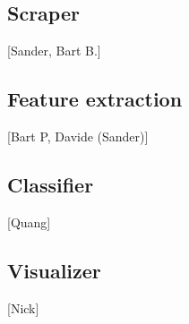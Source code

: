 \subsection{Scraper}
[Sander, Bart B.]
\subsection{Feature extraction}
[Bart P, Davide (Sander)]
\subsection{Classifier}
[Quang]
\subsection{Visualizer}
[Nick]
